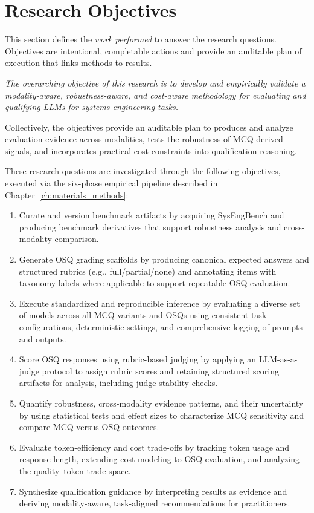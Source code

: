 \section{Research Objectives}\label{sec:research_objectives}

This section defines the \emph{work performed} to answer the research questions. Objectives are intentional, completable actions and provide an auditable plan of execution that links methods to results. 

\emph{The overarching objective of this research is to develop and empirically validate a modality-aware, robustness-aware, and cost-aware methodology for evaluating and qualifying LLMs for systems engineering tasks.}

Collectively, the objectives provide an auditable plan to produces and analyze evaluation evidence across modalities, tests the robustness of MCQ-derived signals, and incorporates practical cost constraints into qualification reasoning.

These research questions are investigated through the following objectives, executed via the six-phase empirical pipeline described in Chapter~\ref{ch:materials_methods}:

\begin{enumerate}
    \item Curate and version benchmark artifacts by acquiring SysEngBench and producing benchmark derivatives that support robustness analysis and cross-modality comparison.
    \item Generate OSQ grading scaffolds by producing canonical expected answers and structured rubrics (e.g., full/partial/none) and annotating items with taxonomy labels where applicable to support repeatable OSQ evaluation.
    \item Execute standardized and reproducible inference by evaluating a diverse set of models across all MCQ variants and OSQs using consistent task configurations, deterministic settings, and comprehensive logging of prompts and outputs.
    \item Score OSQ responses using rubric-based judging by applying an LLM-as-a-judge protocol to assign rubric scores and retaining structured scoring artifacts for analysis, including judge stability checks.
    \item Quantify robustness, cross-modality evidence patterns, and their uncertainty by using statistical tests and effect sizes to characterize MCQ sensitivity and compare MCQ versus OSQ outcomes.
    \item Evaluate token-efficiency and cost trade-offs by tracking token usage and response length, extending cost modeling to OSQ evaluation, and analyzing the quality–token trade space.
    \item Synthesize qualification guidance by interpreting results as evidence and deriving modality-aware, task-aligned recommendations for practitioners. 
\end{enumerate}



